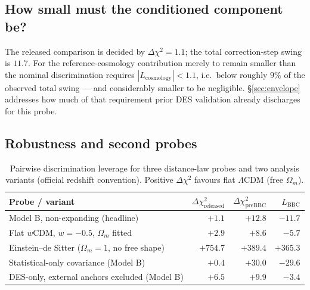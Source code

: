 \documentclass[11pt]{article}
\begin{document}
\subsection{How small must the conditioned component be?}
\label{sec:bound}

The released comparison is decided by $\Delta\chi^2 = 1.1$; the total
correction-step swing is $11.7$. For the reference-cosmology contribution
merely to remain smaller than the nominal discrimination requires
$|L_{\mathrm{cosmology}}| < 1.1$, i.e.\ below roughly $9\%$ of the
observed total swing --- and considerably smaller to be negligible.
\S\ref{sec:envelope} addresses how much of that requirement prior DES
validation already discharges for this probe.

\subsection{Robustness and second probes}
\label{sec:robust}

\begin{table}[ht]
\centering
\caption{Pairwise discrimination leverage for three distance-law probes
and two analysis variants (official redshift convention). Positive
$\Delta\chi^2$ favours flat $\Lambda$CDM (free $\Omega_m$).}
\label{tab:probes}
\begin{tabular}{lrrr}
\toprule
Probe / variant &
$\Delta\chi^2_{\mathrm{released}}$ &
$\Delta\chi^2_{\mathrm{preBBC}}$ &
$L_{\mathrm{BBC}}$ \\
\midrule
Model B, non-expanding (headline)   & $+1.1$  & $+12.8$ & $-11.7$ \\
Flat $w$CDM, $w = -0.5$, $\Omega_m$ fitted & $+2.9$ & $+8.6$ & $-5.7$ \\
Einstein--de Sitter ($\Omega_m = 1$, no free shape) & $+754.7$ & $+389.4$ & $+365.3$ \\
\midrule
Statistical-only covariance (Model B) & $+0.4$ & $+30.0$ & $-29.6$ \\
DES-only, external anchors excluded (Model B) & $+6.5$ & $+9.9$ & $-3.4$ \\
\bottomrule
\end{tabular}
\end{table}
\end{document}

